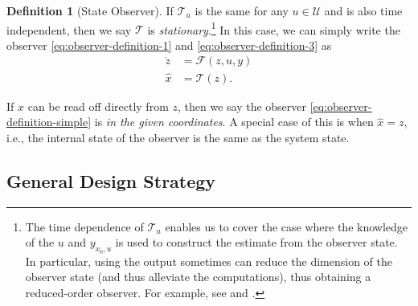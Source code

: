 \documentclass[
]{book}
\theoremstyle{definition}
\newtheorem{definition}{Definition}[chapter]
\theoremstyle{definition}
\theoremstyle{definition}
\theoremstyle{definition}
\theoremstyle{remark}
\begin{document}
\begin{definition}[State Observer]
If \(\mathcal{T}_u\) is the same for any \(u \in \mathcal{U}\) and is also time independent, then we say \(\mathcal{T}\) is \emph{stationary}.\footnote{The time dependence of \(\mathcal{T}_u\) enables us to cover the case where the knowledge of the \(u\) and \(y_{x_0,u}\) is used to construct the estimate from the observer state. In particular, using the output sometimes can reduce the dimension of the observer state (and thus alleviate the computations), thus obtaining a reduced-order observer. For example, see \citep{karagiannis05cdc-nonlinear} and \citep{astolfi03tac-immersion}.} In this case, we can simply write the observer \eqref{eq:observer-definition-1} and \eqref{eq:observer-definition-3} as
\begin{equation}
\begin{split}
\dot{z} &= \mathcal{F}(z,u,y) \\
\hat{x} &= \mathcal{T}(z).
\end{split}
\label{eq:observer-definition-simple}
\end{equation}

If \(\hat{x}\) can be read off directly from \(z\), then we say the observer \eqref{eq:observer-definition-simple} is \emph{in the given coordinates}. A special case of this is when \(\hat{x} = z\), i.e., the internal state of the observer is the same as the system state.
\end{definition}

\hypertarget{general-design-strategy}{%
\subsection{General Design Strategy}\label{general-design-strategy}}
\end{document}
